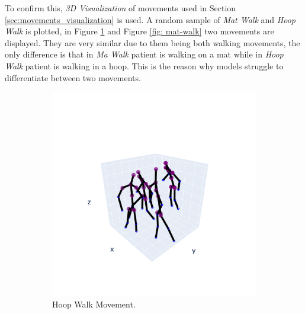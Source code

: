             \newpage

            To confirm this, \textit{3D Visualization} of movements used in Section \ref{sec:movements_visualization} is used. A random sample of \textit{Mat Walk} and \textit{Hoop Walk} is plotted, in Figure \ref{fig: hoop-walk} and Figure \ref{fig: mat-walk} two movements are displayed. They are very similar due to them being both walking movements, the only difference is that in \textit{Ma Walk} patient is walking on a mat while in \textit{Hoop Walk} patient is walking in a hoop. This is the reason why models struggle to differentiate between two movements.

            \begin{figure}[h]
                \begin{subfigure}{.5\textwidth}
                \centering
                  \includegraphics[width=1.\linewidth]{../src/resources/plots/movements/mov-1.png}
                  \caption{Hoop Walk Movement.}
                  \label{fig: hoop-walk}
                \end{subfigure}
                \begin{subfigure}{.5\textwidth}
                \centering

\end{subfigure}
\end{figure}
